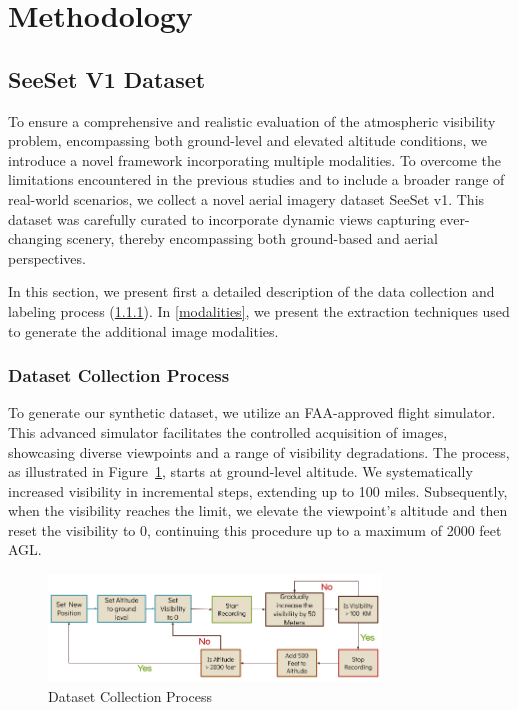 \section{Methodology}
\subsection{SeeSet V1 Dataset}
\label{sec:seeset}
To ensure a comprehensive and realistic evaluation of the atmospheric visibility problem, encompassing both ground-level and elevated altitude conditions, we introduce a novel framework incorporating multiple modalities. 
To overcome the limitations encountered in the previous studies and to include a broader range of real-world scenarios, we collect a novel aerial imagery dataset SeeSet v1. This dataset was carefully curated to incorporate dynamic views capturing ever-changing scenery, thereby encompassing both ground-based and aerial perspectives. 

In this section, we present first a detailed description of the data collection and labeling process (\ref{data_collection}). 
In \ref{modalities}, we present the extraction techniques used to generate the additional image modalities. 


\subsubsection{Dataset Collection Process}
\label{data_collection}

To generate our synthetic dataset, we utilize an FAA-approved flight simulator. This advanced simulator facilitates the controlled acquisition of images, showcasing diverse viewpoints and a range of visibility degradations. The process, as illustrated in Figure~\ref{fig:data_collection_process}, starts at ground-level altitude. We systematically increased visibility in incremental steps, extending up to 100 miles. Subsequently, when the visibility reaches the limit, we elevate the viewpoint's altitude and then reset the visibility to 0, continuing this procedure up to a maximum of 2000 feet AGL.


\begin{figure}[htbp]
\centerline{\includegraphics[width=250pt]{imgs/data_collection_pipeline.png}}
\caption{Dataset Collection Process}
\label{fig:data_collection_process}
\end{figure}
 

